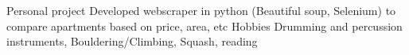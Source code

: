 \documentclass[11pt, a4paper]{awesome-cv}
\begin{document}

\makecvheader[C]



\vspace{-3mm}
 
%




\vspace{5mm}


\begin{cvskills}
    \cvskill
    {Personal project}
    {Developed webscraper in python (Beautiful soup, Selenium) to compare apartments based on price, area, etc}
    \cvskill
    {Hobbies} %
    {Drumming and percussion instruments, Bouldering/Climbing, Squash, reading} %
\end{cvskills}

\end{document}
